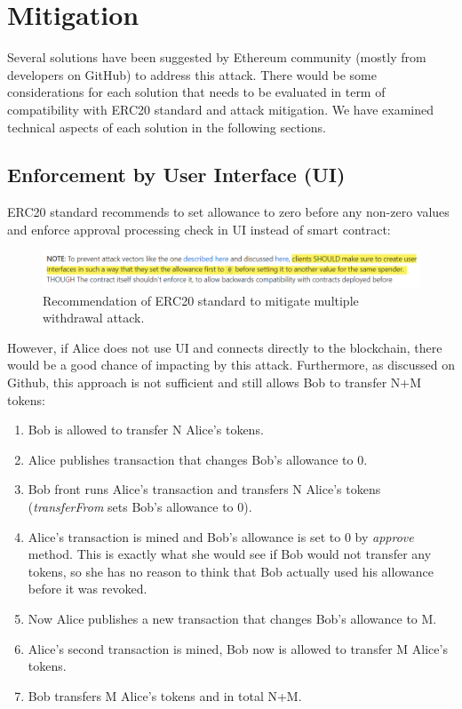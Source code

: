 
\section{Mitigation}
Several solutions have been suggested by Ethereum community (mostly from developers on GitHub) to address this attack. There would be some considerations for each solution that needs to be evaluated in term of compatibility with ERC20 standard and attack mitigation. We have examined technical aspects of each solution in the following sections.

\subsection{Enforcement by User Interface (UI)}
ERC20 standard recommends to set allowance to zero before any non-zero values and enforce approval processing check in UI instead of smart contract:
\begin{figure}[H]
	\centering
	\includegraphics[width=1.0\linewidth]{figures/multiple_withdrawal_03.png}
	\caption{Recommendation of ERC20 standard to mitigate multiple withdrawal attack.}
\end{figure}
\noindent However, if Alice does not use UI and connects directly to the blockchain, there would be a good chance of impacting by this attack. Furthermore, as discussed on Github\cite{Ref14}, this approach is not sufficient and still allows Bob to transfer N+M tokens:
\begin{enumerate}
	\item Bob is allowed to transfer N Alice’s tokens.
	\item Alice publishes transaction that changes Bob’s allowance to 0.
	\item Bob front runs Alice’s transaction and transfers N Alice’s tokens (\textit{transferFrom} sets Bob’s allowance to 0).
	\item Alice’s transaction is mined and Bob’s allowance is set to 0 by \textit{approve} method. This is exactly what she would see if Bob would not transfer any tokens, so she has no reason to think that Bob actually used his allowance before it was revoked.
	\item Now Alice publishes a new transaction that changes Bob’s allowance to M.
	\item Alice’s second transaction is mined, Bob now is allowed to transfer M Alice’s tokens.
	\item Bob transfers M Alice’s tokens and in total N+M.\newline
\end{enumerate}
